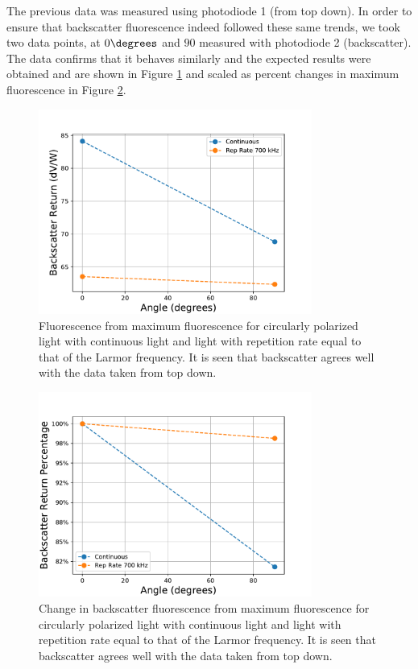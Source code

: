 \documentclass[]{revtex4}
\begin{document}
The previous data was measured using photodiode 1 (from top down). In order to  ensure that backscatter fluorescence indeed followed these same trends, we took two data points, at $0 \degrees$ and $90$ \degrees measured with photodiode 2 (backscatter). The data confirms that it behaves similarly and the expected results were obtained and are shown in Figure \ref{fig:backscatter} and scaled as percent changes in maximum fluorescence in Figure \ref{fig:backscatterscaled}.

\begin{figure}[ht]
	\centering
	\includegraphics[width=0.8\textwidth]{../../MRPData/Backscatter/backscatter.pdf}
	\caption{Fluorescence from maximum fluorescence for circularly polarized light with continuous light and light with repetition rate equal to that of the Larmor frequency. It is seen that backscatter agrees well with the data taken from top down.}
	\label{fig:backscatter}
\end{figure}

\begin{figure}[ht]
	\centering
	\includegraphics[width=0.8\textwidth]{../../MRPData/Backscatter/backscatterScaled.pdf}
	\caption{Change in backscatter fluorescence from maximum fluorescence for circularly polarized light with continuous light and light with repetition rate equal to that of the Larmor frequency. It is seen that backscatter agrees well with the data taken from top down.}
	\label{fig:backscatterscaled}
\end{figure}




\end{document}
